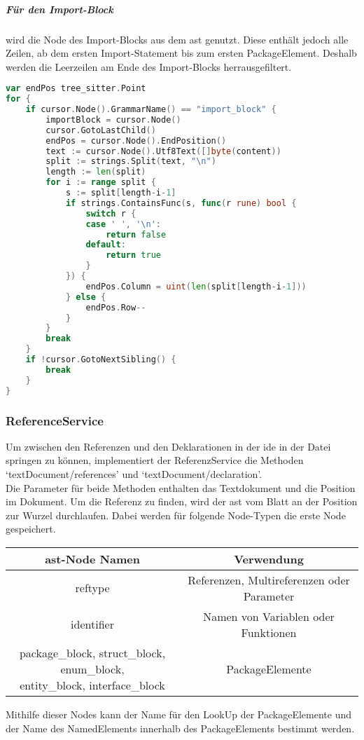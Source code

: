 \documentclass[./einleitung.tex]{subfiles}
\begin{document}
    \subparagraph{Für den Import-Block} wird die Node des Import-Blocks aus dem \acrshort{ast} genutzt.
    Diese enthält jedoch alle Zeilen, ab dem ersten Import-Statement bis zum ersten PackageElement.
    Deshalb werden die Leerzeilen am Ende des Import-Blocks herrausgefiltert.
    \begin{lstlisting}[language=Go, caption=Filterung der leeren Zeilen, label=lst:filterImportFolding]
var endPos tree_sitter.Point
for {
    if cursor.Node().GrammarName() == "import_block" {
        importBlock = cursor.Node()
        cursor.GotoLastChild()
        endPos = cursor.Node().EndPosition()
        text := cursor.Node().Utf8Text([]byte(content))
        split := strings.Split(text, "\n")
        length := len(split)
        for i := range split {
            s := split[length-i-1]
            if strings.ContainsFunc(s, func(r rune) bool {
                switch r {
                case ' ', '\n':
                    return false
                default:
                    return true
                }
            }) {
                endPos.Column = uint(len(split[length-i-1]))
            } else {
                endPos.Row--
            }
        }
        break
    }
    if !cursor.GotoNextSibling() {
        break
    }
}
    \end{lstlisting}

    \subsubsection[ReferenceService]{ReferenceService }\label{subsubsec:reference-service}
    Um zwischen den Referenzen und den Deklarationen in der \acrshort{ide} in der Datei springen zu können, implementiert der ReferenzService die Methoden `textDocument/references' und `textDocument/declaration'. \\
    Die Parameter für beide Methoden enthalten das Textdokument und die Position im Dokument.
    Um die Referenz zu finden, wird der \acrshort{ast} vom Blatt an der Position zur Wurzel durchlaufen.
    Dabei werden für folgende Node-Typen die erste Node gespeichert.
    \begin{center}
        \begin{tabular}{|c|c|}
            \hline
            \acrshort{ast}-Node Namen & Verwendung \\
            \hline
            reftype & Referenzen, Multireferenzen oder Parameter \\
            \hline
            identifier & Namen von Variablen oder Funktionen\\
            \hline
            \makecell{package_block, struct_block, enum_block,\\entity_block, interface_block}& PackageElemente\\
            \hline
        \end{tabular}
    \end{center}
    Mithilfe dieser Nodes kann der Name für den LookUp der PackageElemente und der Name des NamedElements innerhalb des PackageElements bestimmt werden.
\end{document}
